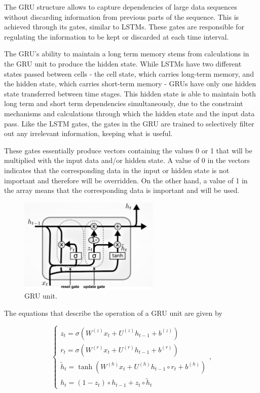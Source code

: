 The \ac{GRU} structure allows to capture dependencies of large data sequences without discarding information from previous parts of the sequence. This is achieved through its gates, similar to \ac{LSTM}s. These gates are responsible for regulating the information to be kept or discarded at each time interval.

The \ac{GRU}'s ability to maintain a long term memory stems from calculations in the \ac{GRU} unit to produce the hidden state. While \ac{LSTM}s have two different states passed between cells - the cell state, which carries long-term memory, and the hidden state, which carries short-term memory - \ac{GRU}s have only one hidden state transferred between time stages. This hidden state is able to maintain both long term and short term dependencies simultaneously, due to the constraint mechanisms and calculations through which the hidden state and the input data pass.  Like the \ac{LSTM} gates, the gates in the \ac{GRU} are trained to selectively filter out any irrelevant information, keeping what is useful.

These gates essentially produce vectors containing the values 0 or 1 that will be multiplied with the input data and/or hidden state. A value of 0 in the vectors indicates that the corresponding data in the input or hidden state is not important and therefore will be overridden. On the other hand, a value of 1 in the array means that the corresponding data is important and will be used.


\begin{figure}[h!]
    \centering
    \begin{center}
    \includegraphics[width=0.6\textwidth]{Images/GRU_cell_detailed.png}
    \caption{GRU unit.}
    \label{gru}
    \end{center}
\end{figure}

The equations that describe the operation of a \ac{GRU} unit are given by 

\begin{equation}
    \begin{cases} 
        
        z_t = \sigma(W^{(z)} x_t + U^{(z)} h_{t-1} + b^{(z)})\\
        r_t = \sigma(W^{(r)} x_t + U^{(r)} h_{t-1} + b^{(r)})\\
        \tilde{h}_t = \tanh(W^{(h)} x_t + U^{(h)} h_{t-1} \circ r_t + b^{(h)})\\
        h_t = (1-z_t) \circ h_{t-1} + z_t \circ \tilde{h}_t

    \end{cases} ,
\end{equation}

